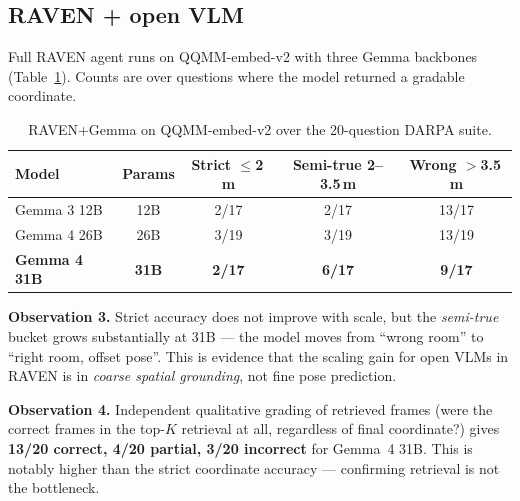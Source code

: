 \documentclass[11pt]{article}
\begin{document}
\subsection{RAVEN + open VLM}
Full RAVEN agent runs on QQMM-embed-v2 with three Gemma backbones (Table~\ref{tab:gemma}). Counts are over questions where the model returned a gradable coordinate.

\begin{table}[h]
\centering
\small
\caption{RAVEN+Gemma on QQMM-embed-v2 over the 20-question DARPA suite.}
\label{tab:gemma}
\begin{tabular}{lcccc}
\toprule
\textbf{Model} & \textbf{Params} & \textbf{Strict $\leq$2\,m} & \textbf{Semi-true 2--3.5\,m} & \textbf{Wrong $>$3.5\,m} \\
\midrule
Gemma 3 12B      & 12B & 2/17 & 2/17 & 13/17 \\
Gemma 4 26B      & 26B & 3/19 & 3/19 & 13/19 \\
\textbf{Gemma 4 31B} & \textbf{31B} & \textbf{2/17} & \textbf{6/17} & \textbf{9/17} \\
\bottomrule
\end{tabular}
\end{table}

\textbf{Observation 3.} Strict accuracy does not improve with scale, but the \emph{semi-true} bucket grows substantially at 31B --- the model moves from ``wrong room'' to ``right room, offset pose''. This is evidence that the scaling gain for open VLMs in RAVEN is in \emph{coarse spatial grounding}, not fine pose prediction.

\textbf{Observation 4.} Independent qualitative grading of retrieved frames (were the correct frames in the top-$K$ retrieval at all, regardless of final coordinate?) gives \textbf{13/20 correct, 4/20 partial, 3/20 incorrect} for Gemma~4 31B. This is notably higher than the strict coordinate accuracy --- confirming retrieval is not the bottleneck.
\end{document}
